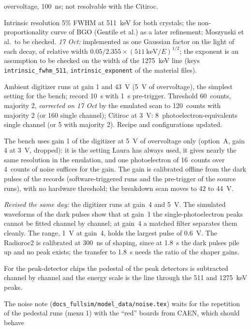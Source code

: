\documentclass[11pt]{article}
\newcommand{\code}[1]{\texttt{#1}}
\newcommand{\us}{\textmu s\xspace}
\begin{document}
\begin{description}
  overvoltage, 100~ns; not resolvable with the Citiroc.
\item[16 Oct 2026] Intrinsic resolution 5\% FWHM at 511~keV for both
  crystals; the non-proportionality curve of BGO (Gentile et al.) as a
  later refinement; Moszynski et al.\ to be checked. \emph{17 Oct:}
  implemented as one Gaussian factor on the light of each decay, of
  relative width $0.05/2.355 \times (511~\mathrm{keV}/E)^{1/2}$; the
  exponent is an assumption to be checked on the width of the 1275~keV line
  (keys \code{intrinsic\_fwhm\_511}, \code{intrinsic\_exponent} of the
  material files).
\item[16 Oct 2026] Ambient digitizer runs at gain 1 and 43~V (5~V of
  overvoltage), the simplest setting for the bench; record 10~\us with
  1~\us pre-trigger. Threshold 60~counts, majority 2, \emph{corrected on
  17 Oct} by the emulated scan to 120~counts with majority 2 (or 160
  single channel); Citiroc at 3~V: 8~photoelectron-equivalents single
  channel (or 5 with majority 2). Recipe and configurations updated.
\item[18 Oct 2026] The bench uses gain 1 of the digitizer at 5~V of
  overvoltage only (option~A, gain 4 at 3~V, dropped): it is the setting
  Laura has always used, it gives nearly the same resolution in the
  emulation, and one photoelectron of 16~counts over 4~counts of noise
  suffices for the gain. The gain is calibrated offline from the dark
  pulses of the records (software-triggered runs and the pre-trigger of the
  source runs), with no hardware threshold; the breakdown scan moves to 42
  to 44~V.
\item[18 Oct 2026] \emph{Revised the same day:} the digitizer runs at
  gain~4 and 5~V. The simulated waveforms of the dark pulses show that at
  gain~1 the single-photoelectron peaks cannot be fitted channel by
  channel; at gain~4 a matched filter separates them cleanly. The range,
  1~V at gain~4, holds the largest pulse of 0.6~V. The Radioroc2 is
  calibrated at 300~ns of shaping, since at 1.8~\us the dark pulses pile
  up and no peak exists; the transfer to 1.8~\us needs the ratio of the
  shaper gains.
\item[18 Oct 2026] For the peak-detector chips the pedestal of the peak
  detectors is subtracted channel by channel and the energy scale is the
  line through the 511 and 1275~keV peaks.
\item[23 Oct 2026] The noise note (\code{docs\_fullsim/model\_data/noise.tex}) waits for the
  repetition of the pedestal runs (menu 1) with the ``red'' boards from CAEN, which should behave

\end{description}
\end{document}
